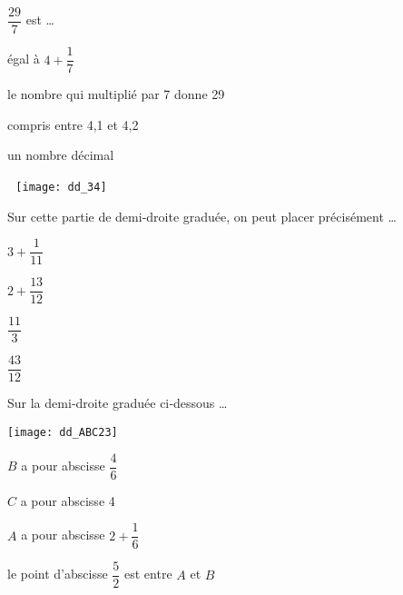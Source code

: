 \begin{QCM}
\begin{GroupeQCM}
    
    \begin{exercice}
      $\dfrac{29}{7}$ est \ldots
      \begin{ChoixQCM}{4}
      \item égal à $4 + \dfrac{1}{7}$
      \item le nombre qui multiplié par 7 donne 29
      \item compris entre 4,1 et 4,2
      \item un nombre décimal
      \end{ChoixQCM}
\begin{corrige}
   \end{corrige}
    \end{exercice}
    
    
    \begin{exercice}
    
      \,\, \qquad \qquad \texttt{[image: dd\_34]}
      
      Sur cette partie de demi‑droite graduée, on peut placer précisément \ldots
      \begin{ChoixQCM}{4}
      \item $3 + \dfrac{1}{11}$
      \item $2 + \dfrac{13}{12}$
      \item $\dfrac{11}{3}$
      \item $\dfrac{43}{12}$
      \end{ChoixQCM}
\begin{corrige}
   \end{corrige}
    \end{exercice}
 

    \begin{exercice}
      Sur la demi‑droite graduée ci‑dessous \ldots
      
      \qquad \qquad \texttt{[image: dd\_ABC23]}
      \begin{ChoixQCM}{4}
      \item $B$ a pour abscisse $\dfrac{4}{6}$
      \item $C$ a pour abscisse 4
      \item $A$ a pour abscisse \newline $2 + \dfrac{1}{6}$
      \item le point d'abscisse $\dfrac{5}{2}$ est entre $A$ et $B$
      \end{ChoixQCM}
\begin{corrige}
   \end{corrige}
    \end{exercice}
    

\end{GroupeQCM}
\end{QCM}

